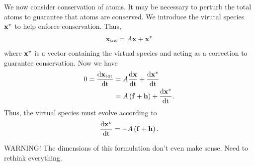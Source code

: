 We now consider conservation of atoms.  It may be necessary to perturb
the total atoms to guarantee that atoms are conserved.  We introduce 
the virutal species $\mathbf{x}^{v}$ to help enforce conservation.  Thus, 
\begin{align}
  \mathbf{x}_{\textrm{tot}} = A\mathbf{x} + \mathbf{x}^{v}
\end{align}
where $\mathbf{x}^{v}$ is a vector containing the virtual species and acting 
as a correction to guarantee conservation.  Now we have 
\begin{align}
  0 = \frac{\mathrm{d} \mathbf{x}_{\textrm{tot}}}{\mathrm{d} \mathrm{t}} &= A\frac{\mathrm{d} \mathbf{x}}{\mathrm{d} \mathrm{t}} + 
       \frac{\mathrm{d} \mathbf{x}^{v}}{\mathrm{d} \mathrm{t}} \\
    &= A\left(\mathbf{f} + \mathbf{h}\right) + \frac{\mathrm{d} \mathbf{x}^{v}}{\mathrm{d} \mathrm{t}}.
\end{align}
Thus, the virtual species must evolve according to 
\begin{align}
  \frac{\mathrm{d} \mathbf{x}^{v}}{\mathrm{d} \mathrm{t}} = -A\left(\mathbf{f} + \mathbf{h}\right).
\end{align}

\begin{tcolorbox}
  WARNING! The dimensions of this formulation don't even
           make sense.  Need to rethink everything.
\end{tcolorbox}
